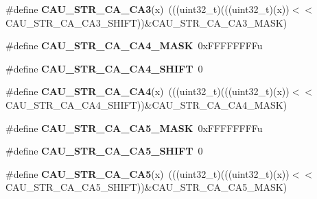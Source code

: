 \begin{DoxyCompactItemize}
\item 
\#define {\bfseries C\+A\+U\+\_\+\+S\+T\+R\+\_\+\+C\+A\+\_\+\+C\+A3}(x)~(((uint32\+\_\+t)(((uint32\+\_\+t)(x))$<$$<$C\+A\+U\+\_\+\+S\+T\+R\+\_\+\+C\+A\+\_\+\+C\+A3\+\_\+\+S\+H\+I\+FT))\&C\+A\+U\+\_\+\+S\+T\+R\+\_\+\+C\+A\+\_\+\+C\+A3\+\_\+\+M\+A\+SK)\hypertarget{group__CAU__Register__Masks_gaf9892859cb2b2bbe38df4ca6530e2780}{}\label{group__CAU__Register__Masks_gaf9892859cb2b2bbe38df4ca6530e2780}

\item 
\#define {\bfseries C\+A\+U\+\_\+\+S\+T\+R\+\_\+\+C\+A\+\_\+\+C\+A4\+\_\+\+M\+A\+SK}~0x\+F\+F\+F\+F\+F\+F\+F\+Fu\hypertarget{group__CAU__Register__Masks_ga201a5c7621a22e47519189370bcdb769}{}\label{group__CAU__Register__Masks_ga201a5c7621a22e47519189370bcdb769}

\item 
\#define {\bfseries C\+A\+U\+\_\+\+S\+T\+R\+\_\+\+C\+A\+\_\+\+C\+A4\+\_\+\+S\+H\+I\+FT}~0\hypertarget{group__CAU__Register__Masks_gaf22d48103a45462f4f1c412212b28941}{}\label{group__CAU__Register__Masks_gaf22d48103a45462f4f1c412212b28941}

\item 
\#define {\bfseries C\+A\+U\+\_\+\+S\+T\+R\+\_\+\+C\+A\+\_\+\+C\+A4}(x)~(((uint32\+\_\+t)(((uint32\+\_\+t)(x))$<$$<$C\+A\+U\+\_\+\+S\+T\+R\+\_\+\+C\+A\+\_\+\+C\+A4\+\_\+\+S\+H\+I\+FT))\&C\+A\+U\+\_\+\+S\+T\+R\+\_\+\+C\+A\+\_\+\+C\+A4\+\_\+\+M\+A\+SK)\hypertarget{group__CAU__Register__Masks_gaaea02f5a37b0a49374d83562863cda67}{}\label{group__CAU__Register__Masks_gaaea02f5a37b0a49374d83562863cda67}

\item 
\#define {\bfseries C\+A\+U\+\_\+\+S\+T\+R\+\_\+\+C\+A\+\_\+\+C\+A5\+\_\+\+M\+A\+SK}~0x\+F\+F\+F\+F\+F\+F\+F\+Fu\hypertarget{group__CAU__Register__Masks_ga4b0911976e175086b6459ec3d90c1653}{}\label{group__CAU__Register__Masks_ga4b0911976e175086b6459ec3d90c1653}

\item 
\#define {\bfseries C\+A\+U\+\_\+\+S\+T\+R\+\_\+\+C\+A\+\_\+\+C\+A5\+\_\+\+S\+H\+I\+FT}~0\hypertarget{group__CAU__Register__Masks_ga550505d55e65ebb24f8b93829fc709dc}{}\label{group__CAU__Register__Masks_ga550505d55e65ebb24f8b93829fc709dc}

\item 
\#define {\bfseries C\+A\+U\+\_\+\+S\+T\+R\+\_\+\+C\+A\+\_\+\+C\+A5}(x)~(((uint32\+\_\+t)(((uint32\+\_\+t)(x))$<$$<$C\+A\+U\+\_\+\+S\+T\+R\+\_\+\+C\+A\+\_\+\+C\+A5\+\_\+\+S\+H\+I\+FT))\&C\+A\+U\+\_\+\+S\+T\+R\+\_\+\+C\+A\+\_\+\+C\+A5\+\_\+\+M\+A\+SK)\hypertarget{group__CAU__Register__Masks_gacaee31158c7c88a14f80a244364c9128}{}\label{group__CAU__Register__Masks_gacaee31158c7c88a14f80a244364c9128}


\end{DoxyCompactItemize}
